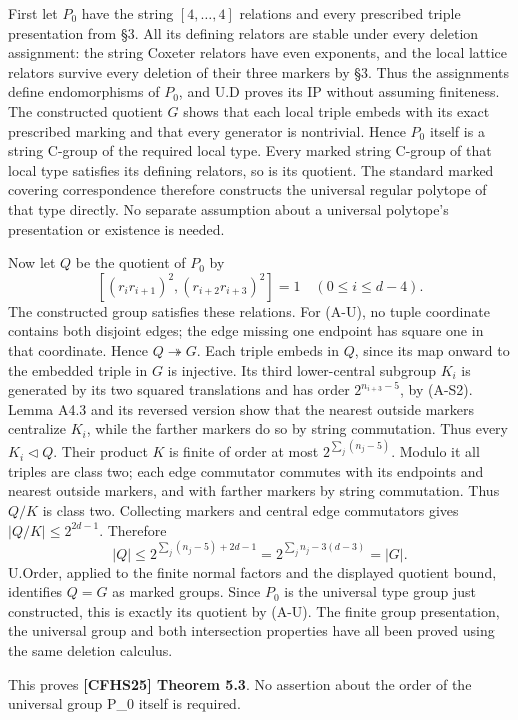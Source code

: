 \documentclass[
  11pt,
  a4paper,
]{article}
\begin{document}
First let \(P_0\) have the string \([4,\ldots,4]\) relations and every
prescribed triple presentation from §3. All its defining relators are
stable under every deletion assignment: the string Coxeter relators have
even exponents, and the local lattice relators survive every deletion of
their three markers by §3. Thus the assignments define endomorphisms of
\(P_0\), and U.D proves its IP without assuming finiteness. The
constructed quotient \(G\) shows that each local triple embeds with its
exact prescribed marking and that every generator is nontrivial. Hence
\(P_0\) itself is a string C-group of the required local type. Every
marked string C-group of that local type satisfies its defining
relators, so is its quotient. The standard marked covering
correspondence therefore constructs the universal regular polytope of
that type directly. No separate assumption about a universal polytope's
presentation or existence is needed.

Now let \(Q\) be the quotient of \(P_0\) by \[
 [(r_i r_{i+1})^2,(r_{i+2}r_{i+3})^2]=1
 \quad(0\le i\le d-4).                                  \tag{A-U}
\] The constructed group satisfies these relations. For (A-U), no tuple
coordinate contains both disjoint edges; the edge missing one endpoint
has square one in that coordinate. Hence \(Q\twoheadrightarrow G\). Each
triple embeds in \(Q\), since its map onward to the embedded triple in
\(G\) is injective. Its third lower-central subgroup \(K_i\) is
generated by its two squared translations and has order
\(2^{n_{i+3}-5}\), by (A-S2). Lemma A4.3 and its reversed version show
that the nearest outside markers centralize \(K_i\), while the farther
markers do so by string commutation. Thus every \(K_i\lhd Q\). Their
product \(K\) is finite of order at most \(2^{\sum_j(n_j-5)}\). Modulo
it all triples are class two; each edge commutator commutes with its
endpoints and nearest outside markers, and with farther markers by
string commutation. Thus \(Q/K\) is class two. Collecting markers and
central edge commutators gives \(|Q/K|\le2^{2d-1}\). Therefore \[
 |Q|\le2^{\sum_j(n_j-5)+2d-1}
      =2^{\sum_j n_j-3(d-3)}=|G|.
\] U.Order, applied to the finite normal factors and the displayed
quotient bound, identifies \(Q=G\) as marked groups. Since \(P_0\) is
the universal type group just constructed, this is exactly its quotient
by (A-U). The finite group presentation, the universal group and both
intersection properties have all been proved using the same deletion
calculus.

This proves \textbf{{[}CFHS25{]} Theorem 5.3}. No assertion about the
order of the universal group P\_0 itself is required.
\end{document}
